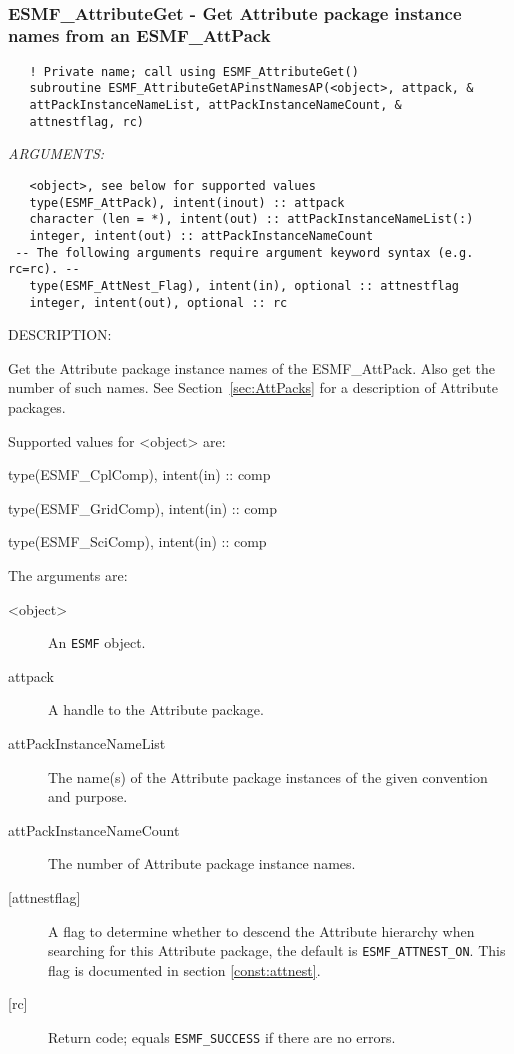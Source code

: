    
 
\mbox{}\hrulefill\ 
 
\subsubsection [ESMF\_AttributeGet] {ESMF\_AttributeGet - Get Attribute package instance names from an ESMF\_AttPack}


  
\begin{verbatim}   ! Private name; call using ESMF_AttributeGet()
   subroutine ESMF_AttributeGetAPinstNamesAP(<object>, attpack, &
   attPackInstanceNameList, attPackInstanceNameCount, &
   attnestflag, rc)\end{verbatim}{\em ARGUMENTS:}
\begin{verbatim}   <object>, see below for supported values
   type(ESMF_AttPack), intent(inout) :: attpack
   character (len = *), intent(out) :: attPackInstanceNameList(:)
   integer, intent(out) :: attPackInstanceNameCount
 -- The following arguments require argument keyword syntax (e.g. rc=rc). --
   type(ESMF_AttNest_Flag), intent(in), optional :: attnestflag
   integer, intent(out), optional :: rc\end{verbatim}
{\sf DESCRIPTION:\\ }


   Get the Attribute package instance names of the ESMF\_AttPack.
   Also get the number of such names.
   See Section~\ref{sec:AttPacks} for a description of Attribute packages.
  
   Supported values for <object> are:
   \begin{description}
   \item type(ESMF\_CplComp), intent(in) :: comp
   \item type(ESMF\_GridComp), intent(in) :: comp
   \item type(ESMF\_SciComp), intent(in) :: comp
   \end{description}
  
   The arguments are:
   \begin{description}
   \item [<object>]
   An {\tt ESMF} object.
   \item [attpack]
   A handle to the Attribute package.
   \item [attPackInstanceNameList]
   The name(s) of the Attribute package instances of the given
   convention and purpose.
   \item [attPackInstanceNameCount]
   The number of Attribute package instance names.
   \item [{[attnestflag]}]
   A flag to determine whether to descend the
   Attribute hierarchy when searching for this Attribute package,
   the default is {\tt ESMF\_ATTNEST\_ON}. This flag is documented
   in section \ref{const:attnest}.
   \item [{[rc]}]
   Return code; equals {\tt ESMF\_SUCCESS} if there are no errors.
   \end{description}
  
